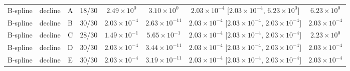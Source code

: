 \begin{tabular}{llcccccc}
B-spline & decline & A & 18/30 & $2.49\times10^{0}$ & $3.10\times10^{0}$ & $2.03\times10^{-4}$ [$2.03\times10^{-4}$, $6.23\times10^{0}$] & $6.23\times10^{0}$\\
B-spline & decline & B & 30/30 & $2.03\times10^{-4}$ & $2.63\times10^{-11}$ & $2.03\times10^{-4}$ [$2.03\times10^{-4}$, $2.03\times10^{-4}$] & $2.03\times10^{-4}$\\
B-spline & decline & C & 28/30 & $1.49\times10^{-1}$ & $5.65\times10^{-1}$ & $2.03\times10^{-4}$ [$2.03\times10^{-4}$, $2.03\times10^{-4}$] & $2.23\times10^{0}$\\
B-spline & decline & D & 30/30 & $2.03\times10^{-4}$ & $3.44\times10^{-11}$ & $2.03\times10^{-4}$ [$2.03\times10^{-4}$, $2.03\times10^{-4}$] & $2.03\times10^{-4}$\\
B-spline & decline & E & 30/30 & $2.03\times10^{-4}$ & $3.19\times10^{-11}$ & $2.03\times10^{-4}$ [$2.03\times10^{-4}$, $2.03\times10^{-4}$] & $2.03\times10^{-4}$\\
\bottomrule
\end{tabular}